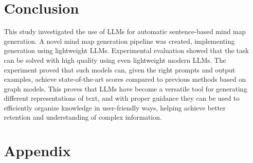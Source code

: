 \documentclass{article}
\begin{document}






\section{Conclusion}
This study investigated the use of LLMs for automatic sentence-based mind map generation. A novel mind map generation pipeline was created, implementing generation using lightweight LLMs. Experimental evaluation showed that the task can be solved with high quality using even lightweight modern LLMs. The experiment proved that such models can, given the right prompts and output examples, achieve state-of-the-art scores compared to previous methods based on graph models. This proves that LLMs have become a versatile tool for generating different representations of text, and with proper guidance they can be used to efficiently organize knowledge in user-friendly ways, helping achieve better retention and understanding of complex information.




\newpage

\appendix

\section*{Appendix}
\label{sec:appendix}
\end{document}
